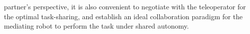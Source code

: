 \documentclass[letterpaper, 11 pt, onecolumn]{article}
\begin{document}
partner's perspective, it is also convenient to negotiate with the teleoperator for the optimal task-sharing, and establish an ideal collaboration paradigm for the mediating robot to perform the task under shared autonomy. 






\end{document}
